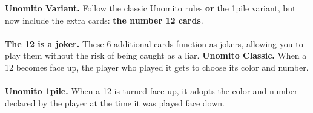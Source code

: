 \documentclass[a4paper]{memoir}
\begin{document}
{\footnotesize

\noindent
\textbf{ Unomito Variant.} Follow the classic Unomito rules \textbf{or} the 1pile variant, but now include the extra cards: \textbf{the number 12 cards}.
\\
\\
\noindent
\textbf{ The 12 is a joker.} These 6 additional cards function as jokers, allowing you to play them without the risk of being caught as a liar.
\newpage
\noindent
\textbf{ Unomito Classic.} When a 12 becomes face up, the player who played it gets to choose its color and number.
\\
\\
\noindent
\textbf{ Unomito 1pile.} When a 12 is turned face up, it adopts the color and number declared by the player at the time it was played face down.
}
\end{document}
